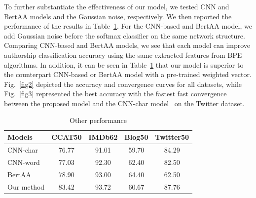 \documentclass[conference]{IEEEtran}
\begin{document}
To further substantiate the effectiveness of our model, we tested CNN and BertAA models and the Gaussian noise, respectively. We then reported the performance of the results in Table~\ref{table4}. For the CNN-based and BertAA model, we add Gaussian noise before the softmax classifier on the same network structure. Comparing CNN-based and BertAA models, we see that each model can improve authorship classification accuracy using the same extracted features from BPE algorithms. In addition, it can be seen in Table~\ref{table4} that our model is superior to the counterpart CNN-based or BertAA model with a pre-trained weighted vector. Fig.~\ref{fig2} depicted the accuracy and convergence curves for all datasets, while Fig.~\ref{fig3}  represented the best accuracy with the fastest fast convergence between the proposed model and the CNN-char model~\cite{ruder2016character} on the Twitter dataset.

\begin{table}[!t]
\centering
\caption{Other performance}\label{table4}
\setlength{\tabcolsep}{1.5pt}
\begin{tabular}{lcccc}
\hline
\textbf{Models} & \textbf{CCAT50}& \textbf{IMDb62}& \textbf{Blog50}& \textbf{Twitter50}\\
\hline
CNN-char~\cite{ruder2016character} & 76.77 & 91.01 & 59.70 & 84.29\\
CNN-word~\cite{ruder2016character} & 77.03 & 92.30 & 62.40 & 82.50\\
BertAA~\cite{fabien2020bertaa} & 78.90 & 93.00 & 64.40 & 62.50\\
\hline
Our method&83.42 & 93.72 & 60.67 & 87.76\\
\hline
\end{tabular}
\end{table}
\end{document}
